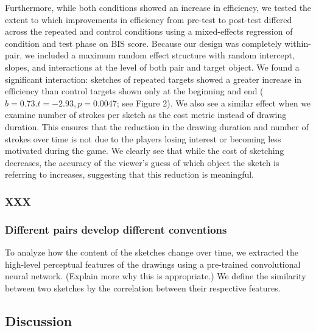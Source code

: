 \documentclass[10pt,letterpaper]{article}
\begin{document}
Furthermore, while both conditions showed an increase in efficiency, we tested the extent to which improvements in efficiency from pre-test to post-test differed across the repeated and control conditions using a mixed-effects regression of condition and test phase on BIS score. Because our design was completely within-pair, we included a maximum random effect structure with random intercept, slopes, and interactions at the level of both pair and target object. We found a significant interaction: sketches of repeated targets showed a greater increase in efficiency than control targets shown only at the beginning and end ($b = 0.73. t = -2.93, p = 0.0047$; see Figure 2). We also see a similar effect when we examine number of strokes per sketch as the cost metric instead of drawing duration. This ensures that the reduction in the drawing duration and number of strokes over time is not due to the players losing interest or becoming less motivated during the game. We clearly see that while the cost of sketching decreases, the accuracy of the viewer's guess of which object the sketch is referring to increases, suggesting that this reduction is meaningful. 



\subsubsection{XXX}

\subsubsection{Different pairs develop different conventions} To analyze how the content of the sketches change over time, we extracted the high-level perceptual features of the drawings using a pre-trained convolutional neural network. (Explain more why this is appropriate.) We define the similarity between two sketches by the correlation between their respective features.%


\subsection{Discussion}
\end{document}
